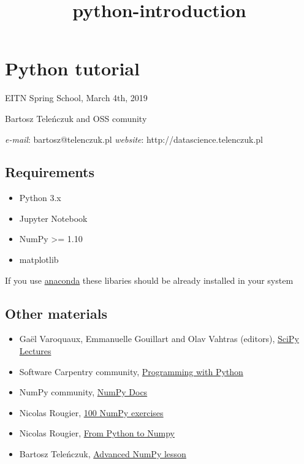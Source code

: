 \documentclass[11pt]{article}
\title{python-introduction}
\providecommand{\tightlist}{%
      \setlength{\itemsep}{0pt}\setlength{\parskip}{0pt}}
\begin{document}
    
    \maketitle
    
    

    
    \hypertarget{python-tutorial}{%
\section{Python tutorial}\label{python-tutorial}}

    EITN Spring School, March 4th, 2019

Bartosz Teleńczuk and OSS comunity

\emph{e-mail}: bartosz@telenczuk.pl \emph{website}:
http://datascience.telenczuk.pl

    \hypertarget{requirements}{%
\subsection{Requirements}\label{requirements}}

\begin{itemize}
\tightlist
\item
  Python 3.x
\item
  Jupyter Notebook
\item
  NumPy \textgreater= 1.10
\item
  matplotlib
\end{itemize}

If you use \href{https://www.continuum.io/downloads}{anaconda} these
libaries should be already installed in your system

    \hypertarget{other-materials}{%
\subsection{Other materials}\label{other-materials}}

\begin{itemize}
\tightlist
\item
  Gaël Varoquaux, Emmanuelle Gouillart and Olav Vahtras (editors),
  \href{http://scipy-lectures.org}{SciPy Lectures}
\item
  Software Carpentry community,
  \href{http://swcarpentry.github.io/python-novice-inflammation/}{Programming
  with Python}
\item
  NumPy community, \href{http://docs.scipy.org/doc/numpy/}{NumPy Docs}
\item
  Nicolas Rougier, \href{https://github.com/rougier/numpy-100}{100 NumPy
  exercises}
\item
  Nicolas Rougier,
  \href{http://www.labri.fr/perso/nrougier/from-python-to-numpy/index.html}{From
  Python to Numpy}
\item
  Bartosz Teleńczuk,
  \href{https://github.com/paris-swc/advanced-numpy-lesson}{Advanced
  NumPy lesson}
\end{itemize}
\end{document}

